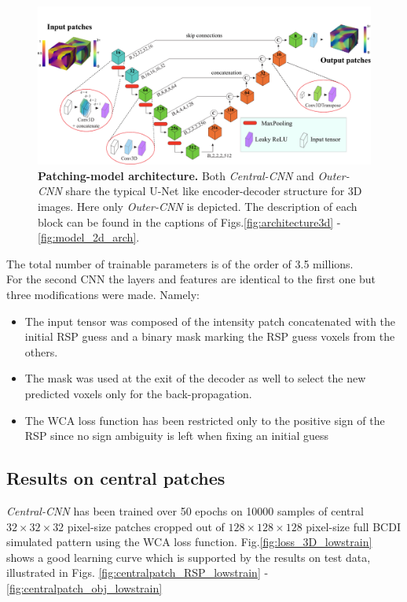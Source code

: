 \begin{figure}[H]
    \centering
    \includegraphics[width=\textwidth]{figures/Phasing/PatchModel_inkscape.pdf}
    \caption{\textbf{Patching-model architecture.} Both \textit{Central-CNN} and \textit{Outer-CNN} share the typical 
    U-Net like encoder-decoder structure for 3D images. Here only \textit{Outer-CNN} is depicted. The description of 
    each block can be found in the captions of Figs.\ref{fig:architecture3d} - \ref{fig:model_2d_arch}. }
    \label{fig:patch_model_arch}
\end{figure}

The total number of trainable parameters is of the order of 3.5 millions. \\
For the second CNN the layers and features are identical to the first one but three modifications were made. Namely:
\begin{itemize}
    \item The input tensor was composed of the intensity patch concatenated with the initial RSP guess and a binary 
    mask marking the RSP guess voxels from the others.
    \item The mask was used at the exit of the decoder as well to 
    select the new predicted voxels only for the back-propagation. 
    \item The WCA loss function has been restricted only to the positive sign of the RSP since no sign ambiguity is left 
    when fixing an initial guess
\end{itemize}

\subsection{Results on central patches}

\textit{Central-CNN} has been trained over 50 epochs on 10000 samples of central $32\times32\times32$ pixel-size patches 
cropped out of $128\times128\times128$ pixel-size full BCDI simulated pattern using the WCA loss function. 
Fig.\ref{fig:loss_3D_lowstrain} shows a good learning curve which is supported by the results on test data, illustrated 
in Figs. \ref{fig:centralpatch_RSP_lowstrain} - \ref{fig:centralpatch_obj_lowstrain}

